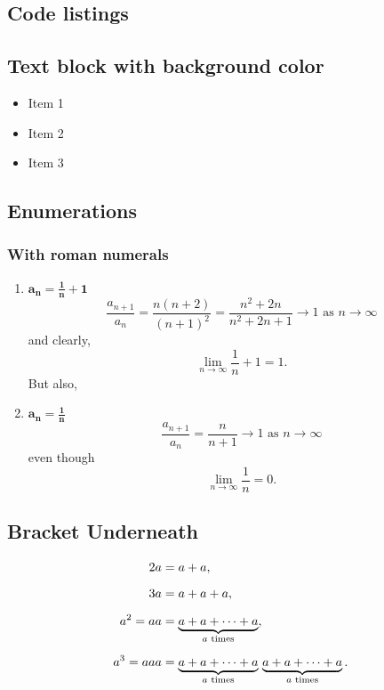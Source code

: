 \documentclass[MathsNotesBase.tex]{subfiles}
\begin{document}
	\subsection{Code listings}
	
	
	\subsection{Text block with background color}
	\begin{tcolorbox}[enhanced jigsaw,colback=note_bg,boxrule=0pt,arc=0pt]
		\begin{itemize}
			\item Item 1
			\item Item 2
			\item Item 3
		\end{itemize}
	\end{tcolorbox}

	\subsection{Enumerations}
	\subsubsection{With roman numerals}
	\begin{enumerate}[label=(\roman*)]
		\item{${\bm{ a_n = \frac{1}{n} + 1 }}$}
		\[ \frac{a_{n+1}}{a_n} = \frac{n(n+2)}{(n+1)^2} =\frac{n^2 + 2n}{n^2 + 2n + 1} \to 1 \text{ as } n \to \infty \]
		and clearly,
		\[ \lim_{n \to \infty} \frac{1}{n} + 1 = 1. \]
		But also,
		\item{${\bm{ a_n = \frac{1}{n} }}$}
		\[  \frac{a_{n+1}}{a_n} = \frac{n}{n+1} \to 1 \text{ as } n \to \infty \]
		even though
		\[ \lim_{n \to \infty} \frac{1}{n} = 0. \]
	\end{enumerate}

	\subsection{Bracket Underneath}
	\[\begin{aligned}
		2a &= a + a, \nn
		3a &= a + a + a, \nn
		a^2 = aa &= \underbrace{a + a + \cdots + a}_{a \text{ times}}, \nn
		a^3 = aaa &= \underbrace{a + a + \cdots + a}_{a \text{ times}} \, \underbrace{a + a + \cdots + a}_{a \text{ times}}.
	\end{aligned}\]
\end{document}
